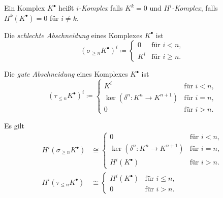 \documentclass{cheat-sheet}
\newcommand{\CCC}[1]{{#1}^{\bullet}} %
\begin{document}


\begin{defn}
  Ein Komplex $\CCC{K}$ heißt \emph{$i$-Komplex} falls $K^k = 0$ und \emph{$H^i$-Komplex}, falls $H^k(\CCC{K}) = 0$ für $i \neq k$.
\end{defn}

\begin{defn}
  Die \emph{schlechte Abschneidung} eines Komplexes $\CCC{K}$ ist
  \[
    (\sigma_{\geq n} \CCC{K})^i \coloneqq \begin{cases}
      0 & \text{für $i < n$,} \\
      K^i & \text{für $i \geq n$.}
    \end{cases}
  \]
\end{defn}

\begin{defn}
  Die \emph{gute Abschneidung} eines Komplexes $\CCC{K}$ ist
  \[
    (\tau_{\leq n} \CCC{K})^i \coloneqq \begin{cases}
      K^i & \text{für $i < n$,} \\
      \ker(\delta^n : K^n \to K^{n+1}) & \text{für $i = n$,} \\
      0 & \text{für $i > n$.}
    \end{cases}
  \]
\end{defn}

\begin{bem}
  Es gilt
  \vspace{-12pt}
  \begin{align*}
    H^i(\sigma_{\geq n} \CCC{K}) & \cong \begin{cases}
      0 & \text{für $i < n$,} \\
      \ker(\delta^n : K^n \to K^{n+1}) & \text{für $i = n$,} \\
      H^i(\CCC{K}) & \text{für $i > n$.}
    \end{cases} \\
    H^i(\tau_{\leq n} \CCC{K}) & \cong \begin{cases}
      H^i(\CCC{K}) & \text{für $i \leq n$,} \\
      0 & \text{für $i > n$.}
    \end{cases}
  \end{align*}
\end{bem}
\end{document}
